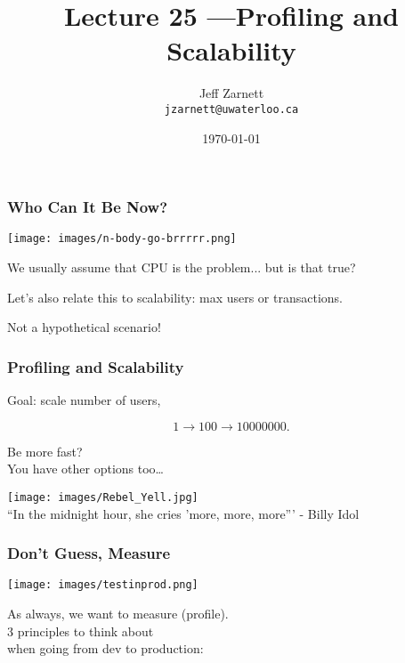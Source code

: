 

\title{Lecture 25 ---Profiling and Scalability}

\author{Jeff Zarnett\\ \small \texttt{jzarnett@uwaterloo.ca}}
\date{\today}




\begin{frame}
  \titlepage

 \end{frame}


\begin{frame}
\frametitle{Who Can It Be Now?}

\begin{center}
	\texttt{[image: images/n-body-go-brrrrr.png]}
\end{center}

We usually assume that CPU is the problem... but is that true?

Let's also relate this to scalability: max users or transactions.

Not a hypothetical scenario!

\end{frame}



\begin{frame}
\frametitle{Profiling and Scalability}


Goal: scale number of users,

\[ 1 \rightarrow 100 \rightarrow 10 000 000. \]

Be more fast? \\
You have other options too\ldots


\begin{center}
	\texttt{[image: images/Rebel\_Yell.jpg]}\\
	\hfill ``In the midnight hour, she cries 'more, more, more''' - Billy Idol
\end{center}

\end{frame}


\begin{frame}
\frametitle{Don't Guess, Measure}


\begin{center}
	\texttt{[image: images/testinprod.png]}
\end{center}


As always, we want to measure (profile).\\[1em]
3 principles to think about\\
when going from dev to production:




\end{frame}



